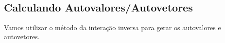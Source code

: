 \documentclass[11pt]{article}
\begin{document}
    \begin{center}
    \end{center}
    { \hspace*{\fill} \\}
    
    \hypertarget{calculando-autovaloresautovetores}{%
\subsection{Calculando
Autovalores/Autovetores}\label{calculando-autovaloresautovetores}}

Vamos utilizar o método da interação inversa para gerar os autovalores e
autovetores.


    
    
    
    
\end{document}
